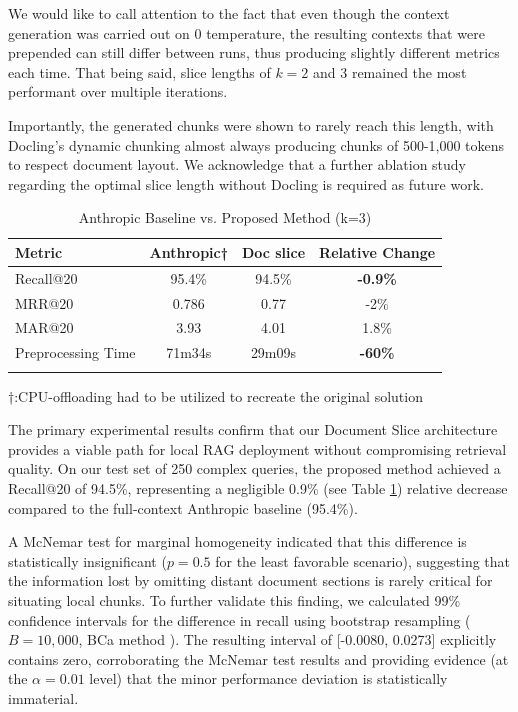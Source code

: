 \documentclass[conference]{IEEEtran}
\begin{document}
We would like to call attention to the fact that even though the context generation was carried out on 0 temperature, the resulting contexts that were prepended can still differ between runs, thus producing slightly different metrics each time. That being said, slice lengths of $k=2$ and $3$ remained the most performant over multiple iterations. 

Importantly, the generated chunks were shown to rarely reach this length, with Docling's dynamic chunking almost always producing chunks of 500-1,000 tokens to respect document layout. We acknowledge that a further ablation study regarding the optimal slice length without Docling is required as future work. 

\begin{table}[h!]
    \centering
    \caption{Anthropic Baseline vs. Proposed Method (k=3)}
    \label{tab:performance_comparison}
    \begin{tabular}{lccc}
        \toprule
        \textbf{Metric} & \textbf{Anthropic†} & \textbf{Doc slice} & \textbf{Relative Change} \\
        \midrule
        Recall@20 & 95.4\% & 94.5\% & \textbf{-0.9\%} \\
        MRR@20 & 0.786 & 0.77 & -2\% \\
        MAR@20 & 3.93 & 4.01 &  1.8\% \\
        Preprocessing Time & 71m34s & 29m09s & \textbf{-60\%} \\
        \bottomrule
        \\
    \end{tabular}
    †:CPU-offloading had to be utilized to recreate the original solution
\end{table}

The primary experimental results confirm that our Document Slice architecture provides a viable path for local RAG deployment without compromising retrieval quality. On our test set of 250 complex queries, the proposed method achieved a Recall@20 of 94.5\%, representing a negligible 0.9\% (see Table \ref{tab:performance_comparison}) relative decrease compared to the full-context Anthropic baseline (95.4\%). 

A McNemar test for marginal homogeneity\cite{McNemar_1947} indicated that this difference is statistically insignificant ($p=0.5$ for the least favorable scenario), suggesting that the information lost by omitting distant document sections is rarely critical for situating local chunks. To further validate this finding, we calculated 99\% confidence intervals for the difference in recall using bootstrap resampling \cite{smucker2007comparison} ($B = 10,000$, BCa method \cite{efron1987better}). The resulting interval of [-0.0080, 0.0273] explicitly contains zero, corroborating the McNemar test results and providing evidence (at the $\alpha = 0.01$ level) that the minor performance deviation is statistically immaterial.
\end{document}
